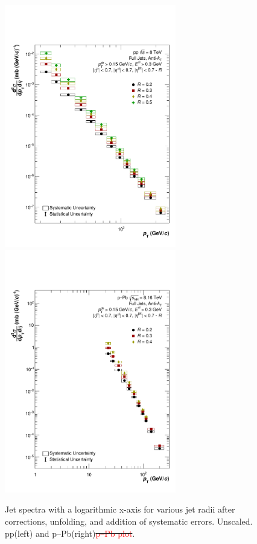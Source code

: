 \documentclass[ALICE]{ALICE_analysis_notes}
\newcommand{\pPb}{{\mbox{p--Pb}}\xspace}
\newcommand{\pp}{pp\xspace}
\providecommand{\DIFdeltex}[1]{{\protect\color{red}\sout{#1}}}                      %
\providecommand{\DIFdelFL}[1]{\DIFdel{#1}} %
\providecommand{\DIFaddbeginFL}{} %
\providecommand{\DIFaddendFL}{} %
\providecommand{\DIFdelbeginFL}{} %
\providecommand{\DIFdelendFL}{} %
\providecommand{\DIFdel}[1]{\texorpdfstring{\DIFdeltex{#1}}{}} %
\newcommand{\DIFscaledelfig}{0.5}
\newlength{\DIFdelgraphicswidth} %
\newlength{\DIFdelgraphicsheight} %
\newcommand{\DIFaddincludegraphics}[2][]{{\color{blue}\fbox{\DIFOincludegraphics[#1]{#2}}}} %
\newcommand{\DIFdelincludegraphics}[2][]{%
\sbox{\DIFdelgraphicsbox}{\DIFOincludegraphics[#1]{#2}}%
\settoboxwidth{\DIFdelgraphicswidth}{\DIFdelgraphicsbox} %
\settoboxtotalheight{\DIFdelgraphicsheight}{\DIFdelgraphicsbox} %
\scalebox{\DIFscaledelfig}{%
\parbox[b]{\DIFdelgraphicswidth}{\usebox{\DIFdelgraphicsbox}\\[-\baselineskip] \rule{\DIFdelgraphicswidth}{0em}}\llap{\resizebox{\DIFdelgraphicswidth}{\DIFdelgraphicsheight}{%
\setlength{\unitlength}{\DIFdelgraphicswidth}%
\begin{picture}(1,1)%
\thicklines\linethickness{2pt} %
{\color[rgb]{1,0,0}\put(0,0){\framebox(1,1){}}}%
{\color[rgb]{1,0,0}\put(0,0){\line( 1,1){1}}}%
{\color[rgb]{1,0,0}\put(0,1){\line(1,-1){1}}}%
\end{picture}%
}\hspace*{3pt}}} %
} %
\DeclareRobustCommand{\DIFaddbeginFL}{\DIFOaddbeginFL \let\includegraphics\DIFaddincludegraphics} %
\DeclareRobustCommand{\DIFaddendFL}{\DIFOaddendFL \let\includegraphics\DIFOincludegraphics} %
\DeclareRobustCommand{\DIFdelbeginFL}{\DIFOdelbeginFL \let\includegraphics\DIFdelincludegraphics} %
\DeclareRobustCommand{\DIFdelendFL}{\DIFOaddendFL \let\includegraphics\DIFOincludegraphics} %
\begin{document}
\begin{figure}
    \centering
    \DIFdelbeginFL %
\DIFdelendFL \DIFaddbeginFL \includegraphics[width=7.5cm]{figures/FinalResults/Bayes_reg6_logx_unscaled.pdf}
    \includegraphics[width=7.5cm]{figures/pPbFigures/FinalResults/Bayes_reg6_logx_unscaled.pdf}
    \DIFaddendFL \caption{Jet spectra with a logarithmic x-axis for various jet radii after corrections, unfolding, and addition of systematic errors. Unscaled. \pp (left) and \pPb (right)\DIFdelbeginFL \DIFdelFL{\textcolor{red}{\pPb plot}}\DIFdelendFL .}
    \label{fig:finalSpectraUnscaledLogX}
\end{figure}
\end{document}
